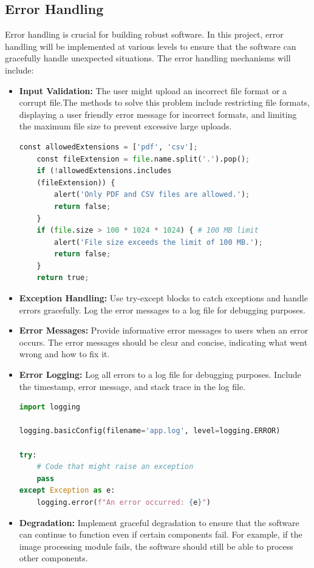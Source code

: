 \documentclass[twocolumn]{article}
\begin{document}
    \subsection{Error Handling}
    Error handling is crucial for building robust software. In this project, error handling will be implemented at various levels to ensure that the software can gracefully handle unexpected situations. The error handling mechanisms will include:
    \begin{itemize}
        \item \textbf{Input Validation:} The user might upload an incorrect file format or a corrupt file.The methods to solve this problem include restricting file formats, displaying a user friendly error message for incorrect formats, and limiting the maximum file size to prevent excessive large uploads.
        

\begin{lstlisting}[language=Python, caption=Input Validation Example]
    const allowedExtensions = ['pdf', 'csv'];
    const fileExtension = file.name.split('.').pop();
    if (!allowedExtensions.includes
    (fileExtension)) {
        alert('Only PDF and CSV files are allowed.');
        return false;
    }
    if (file.size > 100 * 1024 * 1024) { # 100 MB limit
        alert('File size exceeds the limit of 100 MB.');
        return false;
    }
    return true;
\end{lstlisting}


        \item \textbf{Exception Handling:} Use try-except blocks to catch exceptions and handle errors gracefully. Log the error messages to a log file for debugging purposes.
        \item \textbf{Error Messages:} Provide informative error messages to users when an error occurs. The error messages should be clear and concise, indicating what went wrong and how to fix it.
        \item \textbf{Error Logging:} Log all errors to a log file for debugging purposes. Include the timestamp, error message, and stack trace in the log file.
        

\begin{lstlisting}[language=Python, caption=Error Logging Example]
import logging

logging.basicConfig(filename='app.log', level=logging.ERROR)

try:
    # Code that might raise an exception
    pass
except Exception as e:
    logging.error(f"An error occurred: {e}")
\end{lstlisting}


        \item \textbf{Degradation:} Implement graceful degradation to ensure that the software can continue to function even if certain components fail. For example, if the image processing module fails, the software should still be able to process other components.
    \end{itemize}
\end{document}
